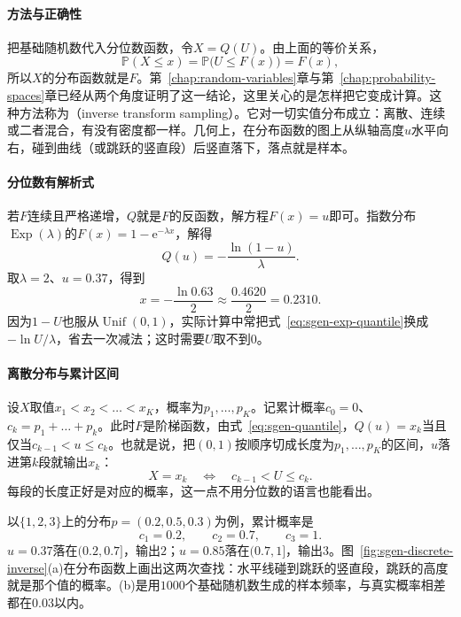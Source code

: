 \paragraph{方法与正确性}
把基础随机数代入分位数函数，令$X=Q(U)$。由上面的等价关系，
\[
  \mathbb{P}(X\le x)=\mathbb{P}\bigl(U\le F(x)\bigr)=F(x),
\]
所以$X$的分布函数就是$F$。第~\ref{chap:random-variables}章与第~\ref{chap:probability-spaces}章已经从两个角度证明了这一结论，这里关心的是怎样把它变成计算。这种方法称为（inverse transform sampling）。它对一切实值分布成立：离散、连续或二者混合，有没有密度都一样。几何上，在分布函数的图上从纵轴高度$u$水平向右，碰到曲线（或跳跃的竖直段）后竖直落下，落点就是样本。

\paragraph{分位数有解析式}
若$F$连续且严格递增，$Q$就是$F$的反函数，解方程$F(x)=u$即可。指数分布$\operatorname{Exp}(\lambda)$的$F(x)=1-\mathrm{e}^{-\lambda x}$，解得
\begin{equation}
  Q(u)=-\frac{\ln(1-u)}{\lambda}.
  \label{eq:sgen-exp-quantile}
\end{equation}
取$\lambda=2$、$u=0.37$，得到
\[
  x=-\frac{\ln0.63}{2}\approx\frac{0.4620}{2}=0.2310.
\]
因为$1-U$也服从$\operatorname{Unif}(0,1)$，实际计算中常把式~\eqref{eq:sgen-exp-quantile}换成$-\ln U/\lambda$，省去一次减法；这时需要$U$取不到$0$。

\paragraph{离散分布与累计区间}
设$X$取值$x_1<x_2<\dots<x_K$，概率为$p_1,\dots,p_K$。记累计概率$c_0=0$、$c_k=p_1+\dots+p_k$。此时$F$是阶梯函数，由式~\eqref{eq:sgen-quantile}，$Q(u)=x_k$当且仅当$c_{k-1}<u\le c_k$。也就是说，把$(0,1)$按顺序切成长度为$p_1,\dots,p_K$的区间，$u$落进第$k$段就输出$x_k$：
\begin{equation}
  X=x_k\quad\Longleftrightarrow\quad c_{k-1}<U\le c_k .
  \label{eq:sgen-discrete-inverse}
\end{equation}
每段的长度正好是对应的概率，这一点不用分位数的语言也能看出。

以$\{1,2,3\}$上的分布$p=(0.2,0.5,0.3)$为例，累计概率是
\[
  c_1=0.2,\qquad c_2=0.7,\qquad c_3=1 .
\]
$u=0.37$落在$(0.2,0.7]$，输出$2$；$u=0.85$落在$(0.7,1]$，输出$3$。图~\ref{fig:sgen-discrete-inverse}(a)在分布函数上画出这两次查找：水平线碰到跳跃的竖直段，跳跃的高度就是那个值的概率。(b)是用$1000$个基础随机数生成的样本频率，与真实概率相差都在$0.03$以内。


